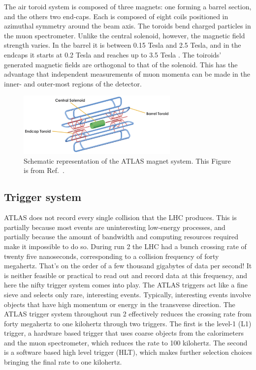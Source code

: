 The air toroid system is composed of three magnets: one forming a barrel section, and the others two end-caps. Each is composed of eight coils positioned in azimuthal symmetry around the beam axis. The toroids bend charged particles in the muon spectrometer. Unlike the central solenoid, however, the magnetic field strength varies. In the barrel it is between 0.15 Tesla and 2.5 Tesla, and in the endcaps it starts at 0.2 Tesla and reaches up to 3.5 Tesla . The toiroids' generated magnetic fields are orthogonal to that of the solenoid. This has the advantage that independent measurements of muon momenta can be made in the inner- and outer-most regions of the detector.

\begin{figure}[htb!]
    \centering
    \includegraphics[width=0.7\textwidth]{Figures/LHC/exp-magnets.png}
    \caption{Schematic representation of the ATLAS magnet system. This Figure is from Ref.~\cite{atlasmagnet}.}
    \label{fig:atlasmagnets}
\end{figure}

\subsection{Trigger system}
\label{ssec:ATLAStrigger}
ATLAS does not record every single collision that the LHC produces. This is partially because most events are uninteresting low-energy processes, and partially because the amount of bandwidth and computing resources required make it impossible to do so. During run 2 the LHC had a bunch crossing rate of twenty five nanoseconds, corresponding to a collision frequency of forty megahertz. That's on the order of a few thousand gigabytes of data per second! It is neither feasible or practical to read out and record data at this frequency, and here the nifty trigger system comes into play. The ATLAS triggers act like a fine sieve and selects only rare, interesting events. Typically, interesting events involve objects that have high momentum or energy in the transverse direction. The ATLAS trigger system throughout run 2 effectively reduces the crossing rate from forty megahertz to one kilohertz through two triggers. The first is the level-1 (L1) trigger, a hardware based trigger that uses coarse objects from the calorimeters and the muon spectrometer, which reduces the rate to 100 kilohertz. The second is a software based high level trigger (HLT), which makes further selection choices bringing the final rate to one kilohertz. 

